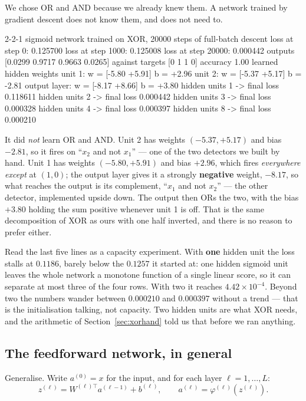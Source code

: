 \documentclass[11pt]{article}
\begin{document}
We chose OR and AND because we already knew them. A network trained by
gradient descent does not know them, and does not need to.

\begin{codeout}
2-2-1 sigmoid network trained on XOR, 20000 steps of full-batch descent
   loss at step     0: 0.125700
   loss at step  1000: 0.125008
   loss at step 20000: 0.000442
   outputs [0.0299 0.9717 0.9663 0.0265] against targets [0 1 1 0]
   accuracy 1.00
   learned hidden weights
      unit 1: w = [-5.80 +5.91]  b = +2.96
      unit 2: w = [-5.37 +5.17]  b = -2.81
   output layer: w = [-8.17 +8.66]  b = +3.80
   hidden units 1 -> final loss 0.118611
   hidden units 2 -> final loss 0.000442
   hidden units 3 -> final loss 0.000328
   hidden units 4 -> final loss 0.000397
   hidden units 8 -> final loss 0.000210
\end{codeout}

It did \emph{not} learn OR and AND. Unit 2 has weights $(-5.37, +5.17)$ and
bias $-2.81$, so it fires on ``$x_2$ and not $x_1$'' --- one of the two
detectors we built by hand. Unit 1 has weights $(-5.80, +5.91)$ and bias
$+2.96$, which fires \emph{everywhere except} at $(1,0)$; the output layer
gives it a strongly \textbf{negative} weight, $-8.17$, so what reaches the
output is its complement, ``$x_1$ and not $x_2$'' --- the other detector,
implemented upside down. The output then ORs the two, with the bias $+3.80$
holding the sum positive whenever unit 1 is off. That is the same
decomposition of XOR as ours with one half inverted, and there is no reason to
prefer either.

Read the last five lines as a capacity experiment. With \textbf{one} hidden
unit the loss stalls at $0.1186$, barely below the $0.1257$ it started at: one
hidden sigmoid unit leaves the whole network a monotone function of a single
linear score, so it can separate at most three of the four rows. With two it
reaches $4.42\times10^{-4}$. Beyond two the numbers wander between
$0.000210$ and $0.000397$ without a trend --- that is the initialisation
talking, not capacity. Two hidden units are what XOR needs, and the arithmetic
of Section~\ref{sec:xorhand} told us that before we ran anything.

\subsection{The feedforward network, in general}

Generalise. Write $a^{(0)} = x$ for the input, and for each layer
$\ell = 1, \dots, L$:
\begin{equation}
  z^{(\ell)} = W^{(\ell)\top} a^{(\ell-1)} + b^{(\ell)},
  \qquad
  a^{(\ell)} = \varphi^{(\ell)}\!\left(z^{(\ell)}\right).
  \label{eq:forward}
\end{equation}
\end{document}

